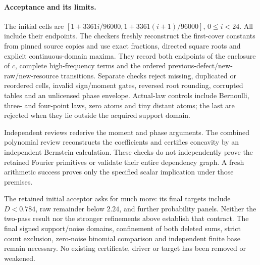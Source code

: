 \paragraph{Acceptance and its limits.}
The initial cells are
$[1+3361i/96000,1+3361(i+1)/96000]$, $0\le i<24$.
All include their endpoints. The checkers freshly reconstruct the
first-cover constants from pinned source copies and use exact fractions,
directed square roots and explicit continuous-domain maxima. They
record both endpoints of the enclosure of $c$, complete high-frequency
terms and the ordered previous-defect/new-raw/new-resource transitions.
Separate checks reject missing, duplicated or reordered cells, invalid
sign/moment gates, reversed root rounding, corrupted tables and an
unlicensed phase envelope. Actual-law controls include Bernoulli,
three- and four-point laws, zero atoms and tiny distant atoms; the last
are rejected when they lie outside the acquired support domain.

Independent reviews rederive the moment and phase arguments. The
combined polynomial review reconstructs the coefficients and certifies
concavity by an independent Bernstein calculation. These checks do not
independently prove the retained Fourier primitives or validate their
entire dependency graph. A fresh arithmetic success proves only the
specified scalar implication under those premises.

The retained initial acceptor asks for much more: its final targets
include $D<0.784$, raw remainder below $2.24$, and further probability
panels. Neither the two-pass result nor the stronger refinements above
establish that contract. The final signed support/noise domains,
confinement of both deleted sums, strict count exclusion, zero-noise
binomial comparison and independent finite base remain necessary.
No existing certificate, driver or target has been removed or weakened.
